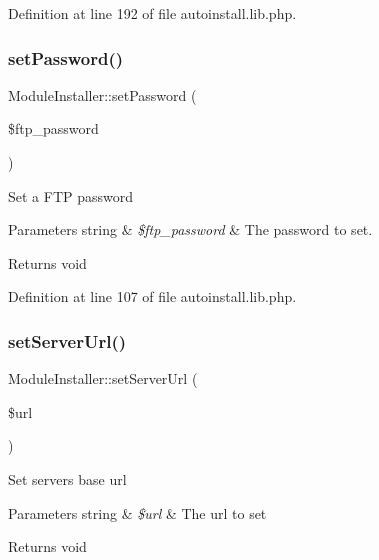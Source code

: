 Definition at line 192 of file autoinstall.\+lib.\+php.

\hypertarget{classModuleInstaller_ad0cad9e399cc3a7de3f742d43364e96a}{}\label{classModuleInstaller_ad0cad9e399cc3a7de3f742d43364e96a} 
\subsubsection{\texorpdfstring{set\+Password()}{setPassword()}}
{\footnotesize\ttfamily Module\+Installer\+::set\+Password (\begin{DoxyParamCaption}\item[{}]{\$ftp\+\_\+password }\end{DoxyParamCaption})}

Set a F\+TP password


\begin{DoxyParams}[1]{Parameters}
string & {\em \$ftp\+\_\+password} & The password to set. \\
\hline
\end{DoxyParams}
\begin{DoxyReturn}{Returns}
void 
\end{DoxyReturn}


Definition at line 107 of file autoinstall.\+lib.\+php.

\hypertarget{classModuleInstaller_a4b4f25bccb1203ee61ff75dd1a0e0964}{}\label{classModuleInstaller_a4b4f25bccb1203ee61ff75dd1a0e0964} 
\subsubsection{\texorpdfstring{set\+Server\+Url()}{setServerUrl()}}
{\footnotesize\ttfamily Module\+Installer\+::set\+Server\+Url (\begin{DoxyParamCaption}\item[{}]{\$url }\end{DoxyParamCaption})}

Set server\textquotesingle{}s base url


\begin{DoxyParams}[1]{Parameters}
string & {\em \$url} & The url to set \\
\hline
\end{DoxyParams}
\begin{DoxyReturn}{Returns}
void 
\end{DoxyReturn}


